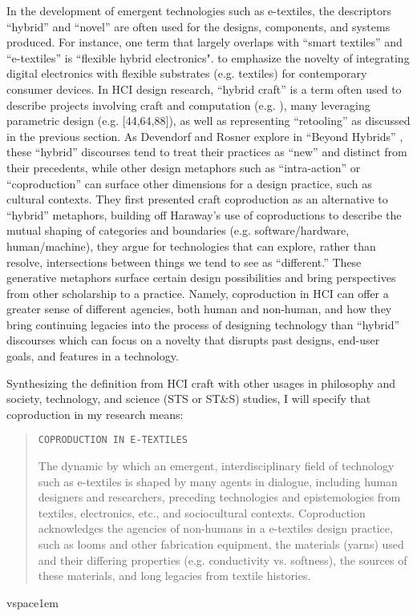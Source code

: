 In the development of emergent technologies such as e-textiles, the descriptors ``hybrid'' and ``novel'' are often used for the designs, components, and systems produced. For instance, one term that largely overlaps with ``smart textiles'' and ``e-textiles'' is ``flexible hybrid electronics". \cite{schwartz_flexible_2017} to emphasize the novelty of integrating digital electronics with flexible substrates (e.g. textiles) for contemporary consumer devices. In HCI design research, ``hybrid craft'' is a term often used to describe projects involving craft and computation (e.g. \todo{[comps 26,88,138]}), many leveraging parametric design (e.g. [44,64,88]), as well as representing ``retooling'' as discussed in the previous section. As Devendorf and Rosner explore in ``Beyond Hybrids'' \cite{devendorf_beyond_2017}, these ``hybrid'' discourses tend to treat their practices as ``new'' and distinct from their precedents, while other design metaphors such as ``intra-action'' or ``coproduction'' can surface other dimensions for a design practice, such as cultural contexts. They first presented craft coproduction as an alternative to ``hybrid'' metaphors, building off Haraway's use of coproductions to describe the mutual shaping of categories and boundaries (e.g. software/hardware, human/machine), they argue for technologies that can explore, rather than resolve, intersections between things we tend to see as ``different.'' These generative metaphors surface certain design possibilities and bring perspectives from other scholarship to a practice. Namely, coproduction in HCI can offer a greater sense of different agencies, both human and non-human, and how they bring continuing legacies into the process of designing technology than ``hybrid'' discourses which can focus on a novelty that disrupts past designs, end-user goals, and features in a technology.

Synthesizing the definition from HCI craft with other usages in philosophy and society, technology, and science (STS or ST\&S) studies, I will specify that coproduction in my research means:

\noindent\begin{minipage}{\linewidth}
  \begin{quote}
    
  \texttt{COPRODUCTION IN E-TEXTILES}

  The dynamic by which an emergent, interdisciplinary field of technology such as e-textiles is shaped by many agents in dialogue, including human designers and researchers, preceding technologies and epistemologies from textiles, electronics, etc., and sociocultural contexts. Coproduction acknowledges the agencies of non-humans in a e-textiles design practice, such as looms and other fabrication equipment, the materials (yarns) used and their differing properties (e.g. conductivity vs. softness), the sources of these materials, and long legacies from textile histories.

  \end{quote}
  vspace{1em}
\end{minipage}

